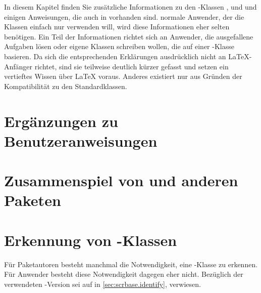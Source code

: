 \BeginIndexGroup%
%
%
%
%
In diesem Kapitel finden Sie zusätzliche Informationen zu den
\KOMAScript-Klassen ,  und  und
einigen Anweisungen, die auch in  vorhanden sind.
 normale Anwender, der die Klassen einfach nur verwenden will, wird
diese Informationen eher selten benötigen. Ein Teil der Informationen richtet
sich an Anwender, die ausgefallene Aufgaben lösen oder eigene Klassen
schreiben wollen, die auf einer \KOMAScript-Klasse basieren. Da sich die
entsprechenden Erklärungen ausdrücklich nicht an \LaTeX-Anfänger richtet, sind
sie teilweise deutlich kürzer gefasst und setzen ein vertieftes Wissen über
\LaTeX{} voraus. Anderes existiert nur aus Gründen der Kompatibilität zu den
Standardklassen.


\section{Ergänzungen zu Benutzeranweisungen}



\section{Zusammenspiel von \KOMAScript{} und anderen Paketen}



\section{Erkennung von \KOMAScript-Klassen}

Für Paketautoren besteht manchmal die Notwendigkeit, eine \KOMAScript-Klasse
zu erkennen. Für Anwender besteht diese Notwendigkeit dagegen eher
nicht. Bezüglich der verwendeten \KOMAScript-Version sei auf
 in \autoref{sec:scrbase.identify},
 verwiesen.

